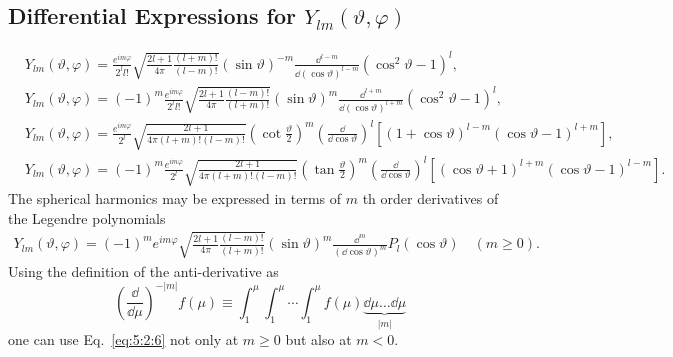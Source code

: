 \subsection{Differential Expressions for $Y_{l m}(\vartheta, \varphi)$}\label{sec:5.2.1}
\begin{align}
& Y_{l m}(\vartheta, \varphi)=\frac{e^{i m \varphi}}{2^{l} l!} \sqrt{\frac{2 l+1}{4 \pi} \frac{(l+m)!}{(l-m)!}}(\sin \vartheta)^{-m} \frac{\dd ^{l-m}}{\dd (\cos \vartheta)^{l-m}}\left(\cos ^{2} \vartheta-1\right)^{l} , \label{eq:5:2:2}\\
& Y_{l m}(\vartheta, \varphi)=(-1)^{m} \frac{e^{i m \varphi}}{2^{l} l!} \sqrt{\frac{2 l+1}{4 \pi} \frac{(l-m)!}{(l+m)!}}(\sin \vartheta)^{m} \frac{\dd^{l+m}}{\dd (\cos \vartheta)^{l+m}}\left(\cos ^{2} \vartheta-1\right)^{l} , \label{eq:5:2:3}\\
& Y_{l m}(\vartheta, \varphi)=\frac{e^{i m \varphi}}{2^{l}} \sqrt{\frac{2 l+1}{4 \pi(l+m)!(l-m)!}}\left(\cot \frac{\vartheta}{2}\right)^{m}\left(\frac{\dd }{\dd  \cos \vartheta}\right)^{l}\left[(1+\cos \vartheta)^{l-m}(\cos \vartheta-1)^{l+m}\right] , \label{eq:5:2:4}\\
& Y_{l m}(\vartheta, \varphi)=(-1)^{m} \frac{e^{i m \varphi}}{2^{l}} \sqrt{\frac{2 l+1}{4 \pi(l+m)!(l-m)!}}\left(\tan \frac{\vartheta}{2}\right)^{m}\left(\frac{\dd }{\dd  \cos \vartheta}\right)^{l}\left[(\cos \vartheta+1)^{l+m}(\cos \vartheta-1)^{l-m}\right]. \label{eq:5:2:5}
\end{align}
The spherical harmonics may be expressed in terms of $m$ th order derivatives of the Legendre polynomials
\begin{gather}
Y_{l m}(\vartheta, \varphi)=(-1)^{m} e^{i m \varphi} \sqrt{\frac{2 l+1}{4 \pi} \frac{(l-m)!}{(l+m)!}}(\sin \vartheta)^{m} \frac{\dd^{m}}{(\dd \cos \vartheta)^{m}} P_{l}(\cos \vartheta)  \label{eq:5:2:6}
\quad (m \geq 0). 
\end{gather}
Using the definition of the anti-derivative as
\begin{equation}
\left(\frac{\dd }{\dd  \mu}\right)^{-|m|} f(\mu) \equiv \int_{1}^{\mu} \int_{1}^{\mu} \cdots \int_{1}^{\mu} f(\mu) \underbrace{\dd  \mu \ldots \dd \mu}_{|m|} \label{eq:5:2:7}
\end{equation}
one can use Eq.~\eqref{eq:5:2:6} not only at $m \geq 0$ but also at $m<0$.

